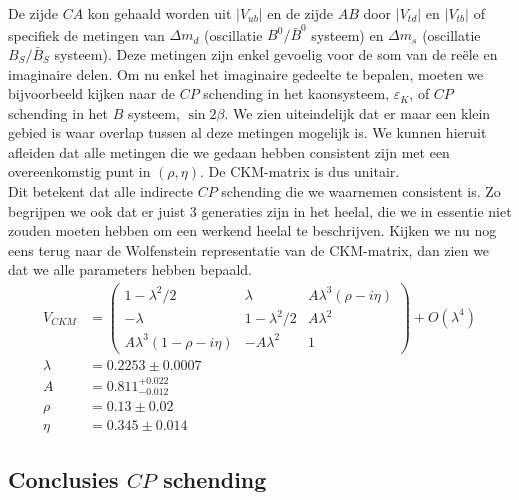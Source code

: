 \documentclass[../main.tex]{subfiles}
\begin{document}
De zijde $CA$ kon  gehaald worden uit $|V_{ub}|$ en de zijde $AB$ door $|V_{td}|$ en $|V_{tb}|$ of specifiek de metingen van $\Delta m_d$ (oscillatie $B^0/\bar{B}^0$ systeem) en $\Delta m_s$ (oscillatie $B_S/\bar{B}_S$ systeem). Deze metingen zijn enkel gevoelig voor de som van de reële en imaginaire delen. Om nu enkel het imaginaire gedeelte te bepalen, moeten we bijvoorbeeld kijken naar de $CP$ schending in het kaonsysteem, $\varepsilon_K$, of $CP$ schending in het $B$ systeem, $\sin 2\beta$. We zien uiteindelijk dat er maar een klein gebied is waar overlap tussen al deze metingen mogelijk is. We kunnen hieruit afleiden dat alle metingen die we gedaan hebben consistent zijn met een overeenkomstig punt in $(\rho, \eta)$. De CKM-matrix is dus unitair.\\
Dit betekent dat alle indirecte $CP$ schending die we waarnemen consistent is. Zo begrijpen we ook dat er juist 3 generaties zijn in het heelal, die we in essentie niet zouden moeten hebben om een werkend heelal te beschrijven. Kijken we nu nog eens terug naar de Wolfenstein representatie van de CKM-matrix, dan zien we dat we alle parameters hebben bepaald.
\begin{equation}
    \begin{aligned}
        \label{eq:wolfenstein_ckm_revisit}
        V_{C K M}&=\left(\begin{array}{ccc}
                1-\lambda^{2} / 2 & \lambda & A \lambda^{3}(\rho-i \eta) \\
                -\lambda & 1-\lambda^{2} / 2 & A \lambda^{2} \\
                A \lambda^{3}(1-\rho-i \eta) & -A \lambda^{2} & 1
        \end{array}\right)+O\left(\lambda^{4}\right)\\
        \lambda &=0.2253 \pm 0.0007 \\
        A &=0.811_{-0.012}^{+0.022} \\
        \rho &=0.13 \pm 0.02 \\
        \eta &=0.345 \pm 0.014
    \end{aligned}
\end{equation}

\subsection{Conclusies $CP$ schending}%
\label{sub:conclusies_cp_schending}
\end{document}
